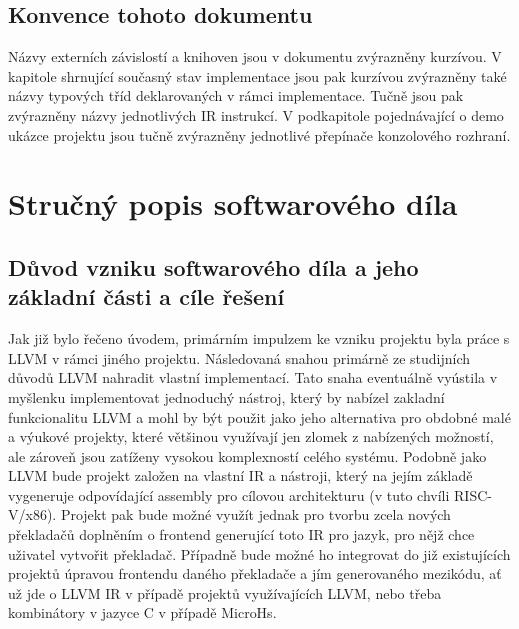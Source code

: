 \documentclass{article}
\def\xxx#1{\textcolor{red!50}{\itshape #1}}
\begin{document}

\subsection{Konvence tohoto dokumentu}

Názvy externích závislostí a knihoven jsou v dokumentu zvýrazněny kurzívou. V kapitole shrnující současný stav implementace jsou pak kurzívou zvýrazněny také názvy typových tříd deklarovaných v rámci implementace. Tučně jsou pak zvýrazněny názvy jednotlivých IR instrukcí. V podkapitole pojednávající o demo ukázce projektu jsou tučně zvýrazněny jednotlivé přepínače konzolového rozhraní.

\section{Stručný popis softwarového díla}

\subsection{Důvod vzniku softwarového díla a jeho základní části a cíle řešení}

Jak již bylo řečeno úvodem, primárním impulzem ke vzniku projektu byla práce s LLVM v rámci jiného projektu. Následovaná snahou primárně ze studijních důvodů LLVM nahradit vlastní implementací. Tato snaha eventuálně vyústila v myšlenku implementovat jednoduchý nástroj, který by nabízel zakladní funkcionalitu LLVM a mohl by být použit jako jeho alternativa pro obdobné malé a výukové projekty, které většinou využívají jen zlomek z nabízených možností, ale zároveň jsou zatíženy vysokou komplexností celého systému. Podobně jako LLVM bude projekt založen na vlastní IR a nástroji, který na jejím základě vygeneruje odpovídající assembly pro cílovou architekturu (v tuto chvíli RISC-V/x86). Projekt pak bude možné využít jednak pro tvorbu zcela nových překladačů doplněním o frontend generující toto IR pro jazyk, pro nějž chce uživatel vytvořit překladač. Případně bude možné ho integrovat do již existujících projektů úpravou frontendu daného překladače a jím generovaného mezikódu, ať už jde o LLVM IR v případě projektů využívajících LLVM, nebo třeba kombinátory v jazyce C v případě MicroHs.
\end{document}

